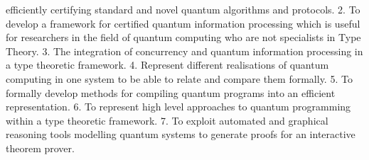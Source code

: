 \documentclass[a4paper]{article}
\begin{document}
efficiently certifying standard and novel quantum algorithms and
protocols.
2.  To develop a framework for certified quantum information
processing which is useful for researchers in the field of quantum
computing who are not specialists in Type Theory.  
3. The integration of concurrency and quantum information
processing in a type theoretic framework.
4. Represent different realisations of quantum computing in one system
to be able to relate and compare them formally.
5. To formally develop methods for compiling quantum programs into an
efficient representation.
6. To represent high level approaches to quantum programming within a
type theoretic framework.
7. To exploit automated and graphical reasoning tools modelling
quantum systems to generate proofs for an interactive theorem prover.

\end{document}
